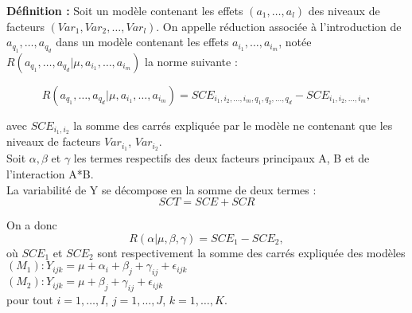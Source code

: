 \documentclass[12pt,a4paper]{report}
\begin{document}
	\textbf{Définition :} Soit un modèle contenant les effets $(a_1,\ldots,a_l)$ des niveaux de facteurs $(Var_1, Var_2, \ldots, Var_l)$. On appelle réduction associée à l'introduction de $a_{q_1}, \ldots, a_{q_d}$ dans un modèle contenant les effets $a_{i_1}, \ldots, a_{i_m}$, notée $R(a_{q_1}, \ldots, a_{q_d}|\mu,a_{i_1}, \ldots, a_{i_m})$ la norme suivante : 
	
	\begin{equation}
		R(a_{q_1}, \ldots, a_{q_d}|\mu,a_{i_1}, \ldots, a_{i_m}) = SCE_{i_1,i_2,\ldots,i_m,q_1,q_2,\ldots,q_d} - SCE_{i_1,i_2,\ldots,i_m},
	\end{equation}
	
	avec $SCE_{i_1,i_2}$ la somme des carrés expliquée par le modèle ne contenant que les niveaux de facteurs $Var_{i_1}$, $Var_{i_2}$.\\
	
	Soit $\alpha , \beta$ et $\gamma $ les termes respectifs des deux facteurs principaux A, B et de l'interaction A*B.\\
	
	La variabilité de Y se décompose en la somme de deux termes : 
	\begin{equation}
		SCT = SCE + SCR
	\end{equation}
	
	On a donc
	\begin{equation}
		R(\alpha|\mu,\beta,\gamma) = SCE_1 - SCE_2,
	\end{equation}
	où $SCE_1$ et $SCE_2$ sont respectivement la somme des carrés expliquée des modèles\\
	$(M_1) : Y_{ijk} = \mu + \alpha_i + \beta_j + \gamma_{ij} + \epsilon_{ijk}$\\
	$(M_2) : Y_{ijk} = \mu + \beta_j + \gamma_{ij} + \epsilon_{ijk}$\\
	pour tout $i = 1,\ldots,I$, $j = 1,\ldots,J$, $k = 1,\ldots,K$.\\
	
\end{document}
